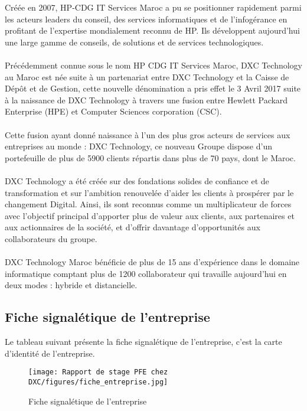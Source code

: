 Créée en 2007, HP-CDG IT Services Maroc a pu se positionner
rapidement parmi les acteurs leaders du conseil, des services informatiques et de
l’infogérance en profitant de l’expertise mondialement reconnu de HP. Ils développent
aujourd’hui une large gamme de conseils, de solutions et de services technologiques.
\\
\\
Précédemment connue sous le nom HP CDG IT Services Maroc, DXC Technology au Maroc est
née suite à un partenariat entre DXC Technology et la Caisse de Dépôt et de Gestion, cette nouvelle dénomination a pris effet le 3 Avril 2017 suite à la naissance de DXC Technology à travers une fusion entre Hewlett Packard Enterprise (HPE) et Computer Sciences corporation (CSC).
\\
\\
Cette fusion ayant donné naissance à l’un des plus gros acteurs de services aux entreprises au monde : DXC Technology, ce nouveau Groupe dispose d’un portefeuille de plus de 5900 clients répartis dans plus de 70 pays, dont le Maroc.
\\
\\
DXC Technology a été créée sur des fondations solides de confiance et de transformation et sur l’ambition renouvelée d’aider les clients à prospérer par le changement Digital. Ainsi, ils sont reconnus comme un multiplicateur de forces avec l’objectif principal d’apporter plus de valeur aux clients, aux partenaires et aux actionnaires de la société, et d’offrir davantage d’opportunités aux collaborateurs du groupe.
\\
\\
DXC Technology Maroc bénéficie de plus de 15 ans d’expérience dans le domaine informatique comptant plus de 1200 collaborateur qui travaille aujourd’hui en deux modes : hybride et distancielle.

\newpage
\subsection{Fiche signalétique de l’entreprise }

Le tableau suivant présente la fiche signalétique de l’entreprise, c’est la carte d’identité de
l’entreprise.

\begin{figure}[h]
    \centering
    \texttt{[image: Rapport de stage PFE chez DXC/figures/fiche\_entreprise.jpg]}
    \caption{Fiche signalétique de l'entreprise}
\end{figure}

